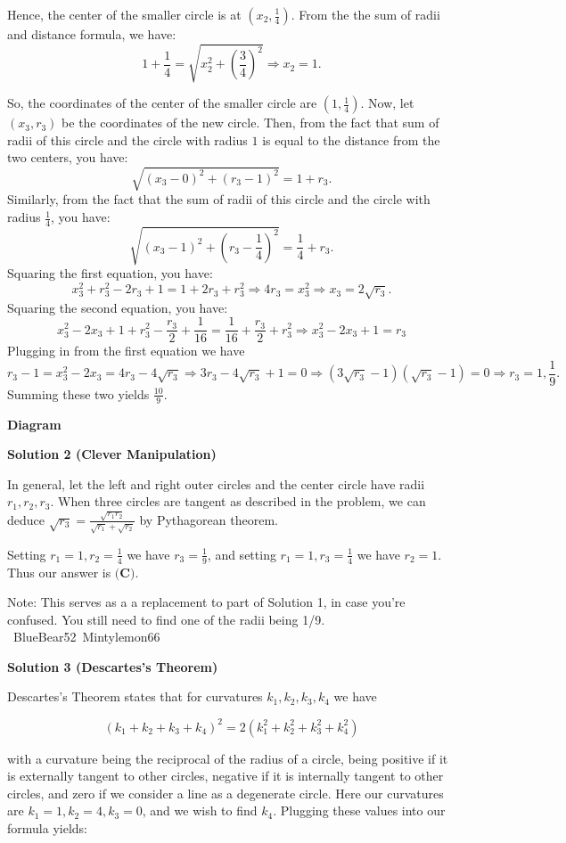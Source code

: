 \begin{enumerate}
 Hence, the center of the smaller circle is at $\left(x_2, \frac14\right)$. From the the sum of radii and distance formula, we have:
 \[1+\frac14 = \sqrt{x_2^2 + \left(\frac34\right)^2} \Rightarrow x_2 = 1.\]

 So, the coordinates of the center of the smaller circle are $(1, \frac14).$ Now, let $(x_3,r_3)$ be the coordinates of the new circle. Then, from the fact that sum of radii of this circle and the circle with radius $1$ is equal to the distance from the two centers, you have:
 \[\sqrt{(x_3-0)^2+(r_3-1)^2} = 1+r_3.\]Similarly, from the fact that the sum of radii of this circle and the circle with radius $\frac14$, you have:
 \[\sqrt{(x_3-1)^2+\left(r_3-\frac14\right)^2}= \frac14 + r_3.\]Squaring the first equation, you have:
 \[x_3^2+r_3^2-2r_3+1=1+2r_3+r_3^2 \Rightarrow 4r_3=x_3^2 \Rightarrow x_3=2\sqrt{r_3}.\]Squaring the second equation, you have:
 \[x_3^2-2x_3+1+r_3^2-\frac{r_3}{2}+\frac{1}{16}=\frac{1}{16}+\frac{r_3}{2}+r_3^2 \Rightarrow x_3^2-2x_3+1=r_3\]Plugging in from the first equation we have
 \[r_3-1=x_3^2-2x_3=4r_3-4\sqrt{r_3} \Rightarrow 3r_3-4\sqrt{r_3}+1=0 \Rightarrow (3\sqrt{r_3}-1)(\sqrt{r_3}-1)=0 \Rightarrow r_3=1, \frac19.\]Summing these two yields $\boxed{\frac{10}{9}}.$

 \textbf{Diagram} 



\textbf{Solution 2 (Clever Manipulation)}

In general, let the left and right outer circles and the center circle have radii $r_1,r_2,r_3$. When three circles are tangent as described in the problem, we can deduce $\sqrt{r_3}=\frac{\sqrt{r_1r_2}}{\sqrt{r_1}+\sqrt{r_2}}$ by Pythagorean theorem. 

 Setting $r_1=1, r_2=\frac14$ we have $r_3=\frac19$, and setting $r_1=1,r_3=\frac14$ we have $r_2=1$. Thus our answer is $\boxed{\textbf{(C)}}$. 

 Note: This serves as a a replacement to part of Solution 1, in case you're confused. You still need to find one of the radii being 1/9. ~BlueBear52~Mintylemon66

 



\textbf{Solution 3 (Descartes’s Theorem)}

Descartes’s Theorem states that for curvatures $k_1,k_2,k_3,k_4$ we have

 
 \[(k_1+k_2+k_3+k_4)^2=2(k_1^2+k_2^2+k_3^2+k_4^2)\]

 with a curvature being the reciprocal of the radius of a circle, being positive if it is externally tangent to other circles, negative if it is internally tangent to other circles, and zero if we consider a line as a degenerate circle. Here our curvatures are $k_1=1,k_2=4,k_3=0$, and we wish to find $k_4$. Plugging these values into our formula yields:


\end{enumerate}
